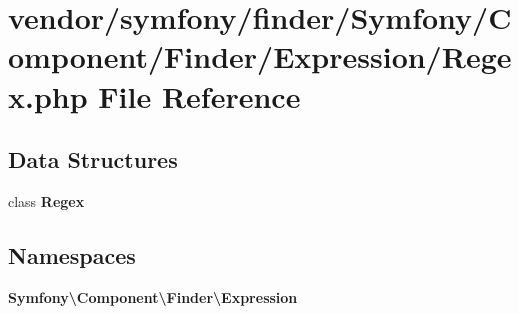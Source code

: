 \section{vendor/symfony/finder/\+Symfony/\+Component/\+Finder/\+Expression/\+Regex.php File Reference}
\label{symfony_2finder_2_symfony_2_component_2_finder_2_expression_2_regex_8php}
\subsection*{Data Structures}
\begin{DoxyCompactItemize}
\item 
class {\bf Regex}
\end{DoxyCompactItemize}
\subsection*{Namespaces}
\begin{DoxyCompactItemize}
\item 
 {\bf Symfony\textbackslash{}\+Component\textbackslash{}\+Finder\textbackslash{}\+Expression}
\end{DoxyCompactItemize}
